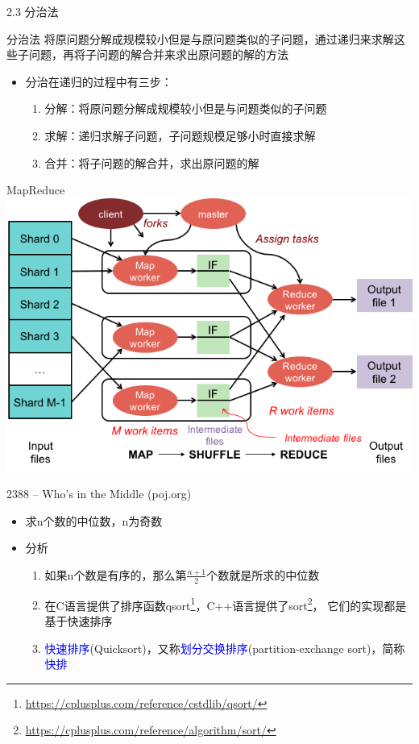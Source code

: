 \begin{frame}{2.3 分治法}
    \begin{block}{分治法}
        将原问题分解成规模较小但是与原问题类似的子问题，通过递归来求解这些子问题，再将子问题的解合并来求出原问题的解的方法
    \end{block}
    \vfill
    \begin{itemize}
        \item 分治在递归的过程中有三步：
        \begin{enumerate}
            \item 分解：将原问题分解成规模较小但是与问题类似的子问题
            \item 求解：递归求解子问题，子问题规模足够小时直接求解
            \item 合并：将子问题的解合并，求出原问题的解
        \end{enumerate}
    \end{itemize}
\end{frame}
\begin{frame}{MapReduce}
    \includegraphics[width=\textwidth]{fig/2-3.png}
\end{frame}
\begin{frame}{2388 -- Who's in the Middle (poj.org)}
    \begin{itemize}
        \item 求n个数的中位数，n为奇数
    \end{itemize}
    \vfill
    \begin{itemize}
        \item 分析
        \begin{enumerate}
            \item 如果n个数是有序的，那么第$\frac{n+1}{2}$个数就是所求的中位数
            \item 在C语言提供了排序函数qsort\footnote{\url{https://cplusplus.com/reference/cstdlib/qsort/}}，C++语言提供了sort\footnote{\url{https://cplusplus.com/reference/algorithm/sort/}}， 它们的实现都是基于快速排序
            \item \textcolor{blue}{快速排序}(Quicksort)，又称\textcolor{blue}{划分交换排序}(partition-exchange sort)，简称\textcolor{blue}{快排}
        \end{enumerate}
    \end{itemize}
\end{frame}
